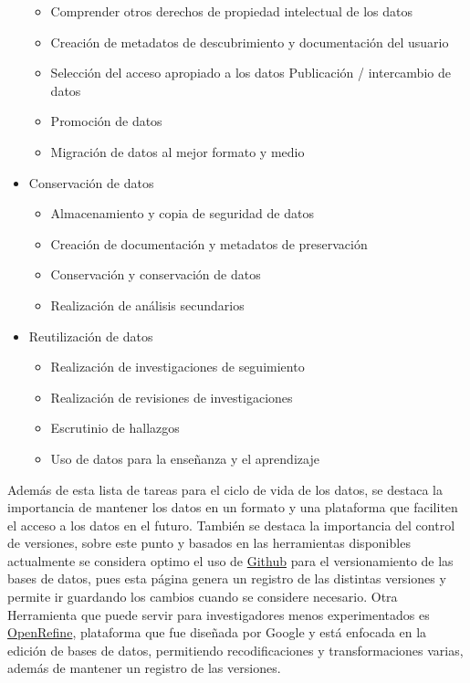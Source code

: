 \documentclass[
  14pt,
]{book}
\providecommand{\tightlist}{%
  \setlength{\itemsep}{0pt}\setlength{\parskip}{0pt}}
\begin{document}
\begin{itemize}
  \begin{itemize}
  \tightlist
  \item
    Comprender otros derechos de propiedad intelectual de los datos
  \item
    Creación de metadatos de descubrimiento y documentación del usuario
  \item
    Selección del acceso apropiado a los datos Publicación / intercambio de datos
  \item
    Promoción de datos
  \item
    Migración de datos al mejor formato y medio
  \end{itemize}
\item
  Conservación de datos

  \begin{itemize}
  \tightlist
  \item
    Almacenamiento y copia de seguridad de datos
  \item
    Creación de documentación y metadatos de preservación
  \item
    Conservación y conservación de datos
  \item
    Realización de análisis secundarios
  \end{itemize}
\item
  Reutilización de datos

  \begin{itemize}
  \tightlist
  \item
    Realización de investigaciones de seguimiento
  \item
    Realización de revisiones de investigaciones
  \item
    Escrutinio de hallazgos
  \item
    Uso de datos para la enseñanza y el aprendizaje
  \end{itemize}
\end{itemize}

Además de esta lista de tareas para el ciclo de vida de los datos, se destaca la importancia de mantener los datos en un formato y una plataforma que faciliten el acceso a los datos en el futuro. También se destaca la importancia del control de versiones, sobre este punto y basados en las herramientas disponibles actualmente se considera optimo el uso de \href{https://github.com/}{Github} para el versionamiento de las bases de datos, pues esta página genera un registro de las distintas versiones y permite ir guardando los cambios cuando se considere necesario. Otra Herramienta que puede servir para investigadores menos experimentados es \href{https://openrefine.org/}{OpenRefine}, plataforma que fue diseñada por Google y está enfocada en la edición de bases de datos, permitiendo recodificaciones y transformaciones varias, además de mantener un registro de las versiones.
\end{document}
